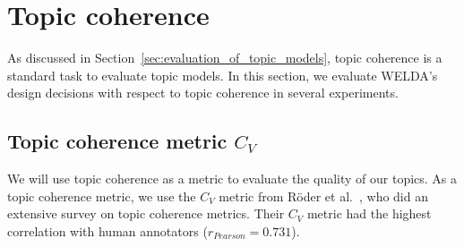 \documentclass[
        a4paper,
        titlepage,
        twoside,
        parskip,
        numbers=noenddot
        ]{scrbook}
\theoremstyle{break}
\begin{document}
\section{Topic coherence}
\label{sec:topic_coherence}
As discussed in Section~\ref{sec:evaluation_of_topic_models}, topic coherence is a standard task to evaluate topic models.
In this section, we evaluate WELDA's design decisions with respect to topic coherence in several experiments.
\subsection{Topic coherence metric $C_V$}

We will use topic coherence as a metric to evaluate the quality of our topics.
As a topic coherence metric, we use the $C_V$ metric from Röder et al.~\cite{Roder2015}, who did an extensive survey on topic coherence metrics.
Their $C_V$ metric had the highest correlation with human annotators ($r_{Pearson} = 0.731$).
\end{document}
